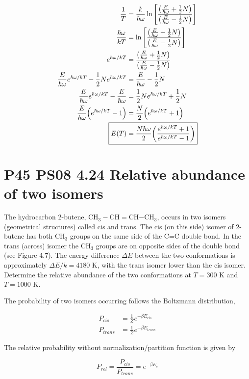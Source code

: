 \documentclass[9pt,a4paper,twocolumn]{article}
\begin{document}
\begin{align}
    \frac{1}{T} &= \frac{k}{\hbar\omega}\ln\qty[\frac{\qty(\frac{E}{\hbar\omega} + \frac{1}{2}N)}{\qty(\frac{E}{\hbar\omega} - \frac{1}{2}N)}] \nonumber\\
    \frac{\hbar\omega}{kT} &= \ln\qty[\frac{\qty(\frac{E}{\hbar\omega} + \frac{1}{2}N)}{\qty(\frac{E}{\hbar\omega} - \frac{1}{2}N)}]\\
    e^{\hbar\omega/kT} &= \frac{\qty(\frac{E}{\hbar\omega} + \frac{1}{2}N)}{\qty(\frac{E}{\hbar\omega} - \frac{1}{2}N)}\\
    \frac{E}{\hbar\omega}e^{\hbar\omega/kT} - \frac{1}{2}Ne^{\hbar\omega/kT} &= \frac{E}{\hbar\omega} - \frac{1}{2}N\\
    \frac{E}{\hbar\omega}e^{\hbar\omega/kT} - \frac{E}{\hbar\omega} &= \frac{1}{2}Ne^{\hbar\omega/kT} + \frac{1}{2}N\\
    \frac{E}{\hbar\omega}\qty(e^{\hbar\omega/kT}-1) &= \frac{N}{2}\qty(e^{\hbar\omega/kT}+1)\\
    \Aboxed{
	    E(T) &= \frac{N\hbar\omega}{2}\qty(\frac{e^{\hbar\omega/kT}+1}{e^{\hbar\omega/kT}-1})
    }
\end{align}

\section{P45 PS08 4.24 Relative abundance of two isomers}
The hydrocarbon 2-butene, CH$_3-$CH$=$CH$-$CH$_3$, occurs in two isomers (geometrical structures) called cis and trans. The cis (on this side) isomer of 2-butene has both CH$_3$ groups on the same side of the C=C double bond. In the trans (across) isomer the CH$_3$ groups are on opposite sides of the double bond (see Figure 4.7). The energy difference $\Delta E$ between the two conformations is approximately $\Delta E/k = 4180$ K, with the trans isomer lower than the cis isomer. Determine the relative abundance of the two conformations at $T = 300$ K and $T = 1000$ K.

The probability of two isomers occurring follows the Boltzmann distribution,

\begin{align}
	P_{cis} &= \frac{1}{Z}e^{-\beta E_{cis}} \\
	P_{trans} &= \frac{1}{Z}e^{-\beta E_{trans}}
\end{align}

The relative probability without normalization/partition function is given by

\begin{equation}
	P_{rel} = \frac{P_{cis}}{P_{trans}} = e^{-\beta E_s} \label{eq:given-p}
\end{equation}
\end{document}
